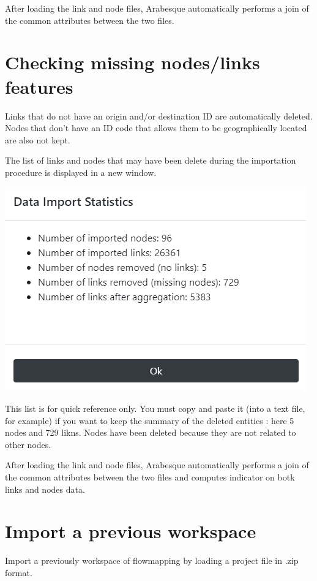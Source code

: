 \documentclass[
  letterpaper,
  DIV=11,
  numbers=noendperiod]{scrreprt}
\begin{document}
After loading the link and node files, Arabesque automatically performs
a join of the common attributes between the two files.

\section{Checking missing nodes/links
features}\label{checking-missing-nodeslinks-features}

Links that do not have an origin and/or destination ID are automatically
deleted. Nodes that don't have an ID code that allows them to be
geographically located are also not kept.

The list of links and nodes that may have been delete during the
importation procedure is displayed in a new window.

\includegraphics{images/import_suppr_entities.png}

This list is for quick reference only. You must copy and paste it (into
a text file, for example) if you want to keep the summary of the deleted
entities : here 5 nodes and 729 likns. Nodes have been deleted because
they are not related to other nodes.

After loading the link and node files, Arabesque automatically performs
a join of the common attributes between the two files and computes
indicator on botk links and nodes data.

\section{Import a previous workspace}\label{import-a-previous-workspace}

Import a previously workspace of flowmapping by loading a project file
in .zip format.
\end{document}
